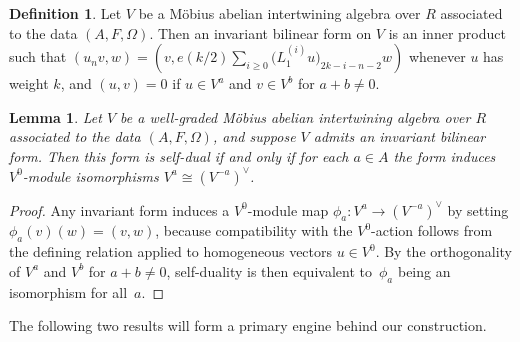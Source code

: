 \documentclass[11pt]{article}
\newtheorem{lem}[thm]{Lemma}
\theoremstyle{definition}
\newtheorem{defn}[thm]{Definition}
\begin{document}
\begin{defn}Let $V$ be a M\"obius abelian intertwining algebra over $R$ associated to the data $(A,F,\Omega)$. Then an invariant bilinear form on $V$ is an inner product such that $(u_n v,w) = (v, e(k/2) \sum\limits_{i \geq 0} \big(L_1^{(i)} u\big)_{2k-i-n-2}w)$ whenever $u$ has weight $k$, and $(u,v) = 0$ if $u \in V^a$ and $v \in V^b$ for $a+b \neq 0$.
\end{defn}

\begin{lem}Let $V$ be a well-graded M\"obius abelian intertwining algebra over $R$ associated to the data $(A,F,\Omega)$, and suppose $V$ admits an invariant bilinear form. Then this form is self-dual if and only if for each $a \in A$ the form induces $V^0$-module isomorphisms $V^a \cong (V^{-a})^\vee$.
\end{lem}
\begin{proof}Any invariant form induces a $V^0$-module map $\phi_a\colon V^a \to (V^{-a})^\vee$ by setting $\phi_a(v)(w) = (v,w)$, because compatibility with the $V^0$-action follows from the defining relation applied to homogeneous vectors $u \in V^0$. By the orthogonality of $V^a$ and $V^b$ for $a+b \neq 0$, self-duality is then equivalent to~$\phi_a$ being an isomorphism for all~$a$.
\end{proof}

The following two results will form a primary engine behind our construction.
\end{document}
